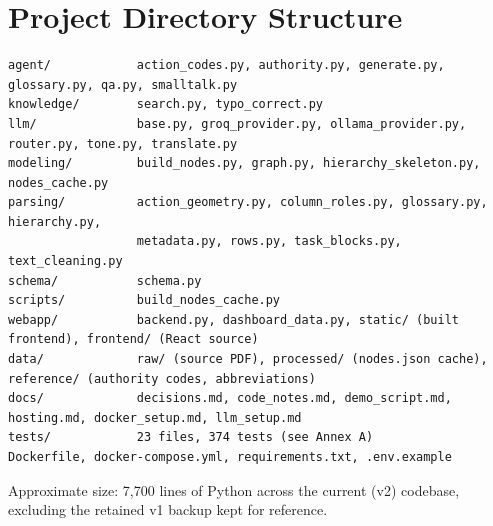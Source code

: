 \chapter{Project Directory Structure}
\label{ch:project-directory-structure}
\begin{lstlisting}
agent/            action_codes.py, authority.py, generate.py, glossary.py, qa.py, smalltalk.py
knowledge/        search.py, typo_correct.py
llm/              base.py, groq_provider.py, ollama_provider.py, router.py, tone.py, translate.py
modeling/         build_nodes.py, graph.py, hierarchy_skeleton.py, nodes_cache.py
parsing/          action_geometry.py, column_roles.py, glossary.py, hierarchy.py,
                  metadata.py, rows.py, task_blocks.py, text_cleaning.py
schema/           schema.py
scripts/          build_nodes_cache.py
webapp/           backend.py, dashboard_data.py, static/ (built frontend), frontend/ (React source)
data/             raw/ (source PDF), processed/ (nodes.json cache), reference/ (authority codes, abbreviations)
docs/             decisions.md, code_notes.md, demo_script.md, hosting.md, docker_setup.md, llm_setup.md
tests/            23 files, 374 tests (see Annex A)
Dockerfile, docker-compose.yml, requirements.txt, .env.example
\end{lstlisting}
Approximate size: 7,700 lines of Python across the current (v2) codebase, excluding the retained v1 backup kept for reference.

